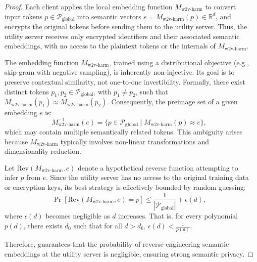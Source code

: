 \begin{proof}
Each client applies the local embedding function \(M_{\text{w2v-harm}}\) to convert input tokens \(p \in \mathcal{P}_{\text{global}}\) into semantic vectors \(e = M_{\text{w2v-harm}}(p) \in \mathbb{R}^d\), and encrypts the original tokens before sending them to the utility server. Thus, the utility server receives only encrypted identifiers and their associated semantic embeddings, with no access to the plaintext tokens or the internals of \(M_{\text{w2v-harm}}\).

The embedding function \(M_{\text{w2v-harm}}\), trained using a distributional objective (e.g., skip-gram with negative sampling), is inherently non-injective. Its goal is to preserve contextual similarity, not one-to-one invertibility. Formally, there exist distinct tokens \(p_1, p_2 \in \mathcal{P}_{\text{global}}\), with \(p_1 \neq p_2\), such that \(M_{\text{w2v-harm}}(p_1) \approx M_{\text{w2v-harm}}(p_2)\). Consequently, the preimage set of a given embedding \(e\) is:
\[
M_{\text{w2v-harm}}^{-1}(e) = \{p \in \mathcal{P}_{\text{global}} \mid M_{\text{w2v-harm}}(p) \approx e\},
\]
which may contain multiple semantically related tokens. This ambiguity arises because \(M_{\text{w2v-harm}}\) typically involves non-linear transformations and dimensionality reduction.

Let \(\text{Rev}(M_{\text{w2v-harm}}, e)\) denote a hypothetical reverse function attempting to infer \(p\) from \(e\). Since the utility server has no access to the original training data or encryption keys, its best strategy is effectively bounded by random guessing:
\[
\Pr[\text{Rev}(M_{\text{w2v-harm}}, e) = p] \leq \frac{1}{|\mathcal{P}_{\text{global}}|} + \epsilon(d),
\]
where \(\epsilon(d)\) becomes negligible as \(d\) increases. That is, for every polynomial \(p(d)\), there exists \(d_0\) such that for all \(d > d_0\), \(\epsilon(d) < \frac{1}{p(d)}\).

Therefore, \Sys guarantees that the probability of reverse-engineering semantic embeddings at the utility server is negligible, ensuring strong semantic privacy.
\end{proof}

